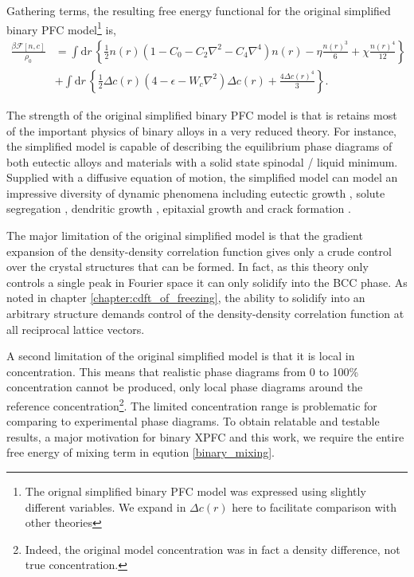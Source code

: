 \documentclass[showkeys, prb, reprint]{revtex4-1}
\newcommand{\F}{\mathcal{F}}    %
\renewcommand{\l}{\left}        %
\renewcommand{\r}{\right}       %
\newcommand{\f}{\frac}          %
\newcommand{\integrate}[1]{\int \mathrm{d}#1\,}
\begin{document}
Gathering terms, the resulting free energy functional for the original
simplified binary PFC model\footnote{The orignal simplified binary PFC model
was expressed using slightly different variables. We expand in $\Delta c(r)$
here to facilitate comparison with other theories} is,
%
\begin{align}
    \f{\beta\F[n, c]}{\rho_0} &= \integrate{r} \l\lbrace 
        \f{1}{2} n(r) \l( 1 - C_0 - C_2 \nabla^2 - C_4\nabla^4 \r) n(r)
      - \eta\f{n(r)^3}{6} + \chi\f{n(r)^4}{12} \r\rbrace \\
    &+ \integrate{r} \l\lbrace
        \f{1}{2} \Delta c(r) \l( 4 - \epsilon - W_c\nabla^2 \r) \Delta c(r) 
      + \f{4 \Delta c(r)^4}{3} \r\rbrace. \nonumber
\end{align}
%

The strength of the original simplified binary PFC model is that is retains
most of the important physics of binary alloys in a very reduced theory. For
instance, the simplified model is capable of describing the equilibrium phase
diagrams of both eutectic alloys and materials with a solid state spinodal /
liquid minimum.  Supplied with a diffusive equation of motion, the simplified
model can model an impressive diversity of dynamic phenomena including eutectic
growth \cite{ELDER07}, solute segregation \cite{STOLLE14}, dendritic growth
\cite{ELDER07}, epitaxial growth \cite{ELDER10_NANOISLAND, LU16} and crack
formation \cite{HU17}.

The major limitation of the original simplified model is that the gradient
expansion of the density-density correlation function gives only a crude
control over the crystal structures that can be formed. In fact, as this theory
only controls a single peak in Fourier space it can only solidify into the BCC
phase. As noted in chapter \ref{chapter:cdft_of_freezing}, the ability to
solidify into an arbitrary structure demands control of the density-density
correlation function at all reciprocal lattice vectors.

A second limitation of the original simplified model is that it is local in
concentration. This means that realistic phase diagrams from 0 to 100\%
concentration cannot be produced, only local phase diagrams around the
reference concentration\footnote{Indeed, the original model concentration was
in fact a density difference, not true concentration.}. The limited
concentration range is problematic for comparing to experimental phase
diagrams. To obtain relatable and testable results, a major motivation for
binary XPFC and this work, we require the entire free energy of mixing term in
eqution \ref{binary_mixing}.
\end{document}

